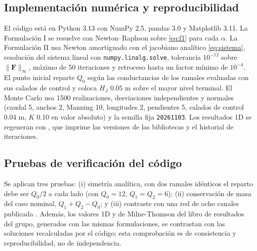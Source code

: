\subsection{Implementación numérica y reproducibilidad}
El código está en Python 3.13 con NumPy 2.5, pandas 3.0 y Matplotlib 3.11. La Formulación I se resuelve con Newton--Raphson sobre \eqref{eq:f1} para cada $\alpha$. La Formulación II usa Newton amortiguado con el jacobiano analítico \eqref{eq:sistema}, resolución del sistema lineal con \texttt{numpy.linalg.solve}, tolerancia $10^{-12}$ sobre $\|\mathbf F\|_\infty$, máximo de 50 iteraciones y retroceso hasta un factor mínimo de $10^{-4}$. El punto inicial reparte $Q_0$ según las conductancias de los ramales evaluadas con sus calados de control y coloca $H_J$ $0.05$ m sobre el mayor nivel terminal. El Monte Carlo usa 1500 realizaciones, desviaciones independientes y normales (caudal 5\pc, anchos 2\pc, Manning 10\pc, longitudes 2\pc, pendientes 5\pc, calados de control 0.04 m, $K$ 0.10 en valor absoluto) y la semilla fija \texttt{20261103}. Los resultados 1D se regeneran con , que imprime las versiones de las bibliotecas y el historial de iteraciones.

\subsection{Pruebas de verificación del código}
Se aplican tres pruebas: (i) simetría analítica, con dos ramales idénticos el reparto debe ser $Q_0/2$ a cada lado (con $Q_0=12$, $Q_1=Q_2=6$); (ii) conservación de masa del caso nominal, $Q_1+Q_2-Q_0$; y (iii) contraste con una red de ocho canales publicada \citep[cap.~6]{chaudhry2008}. Además, los valores 1D y de Milne-Thomson del libro de resultados del grupo, generados con las mismas formulaciones, se contrastan con las soluciones recalculadas por el código; esta comprobación es de consistencia y reproducibilidad, no de independencia.

